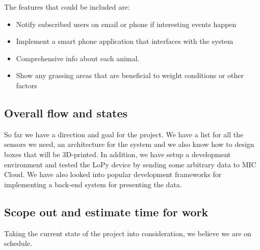	The features that could be included are:
	\begin{itemize}  
		\item Notify subscribed users on email or phone if interesting events happen
		\item Implement a smart phone application that interfaces with the system
		\item Comprehensive info about each animal.
		\item Show any grassing areas that are beneficial to weight conditions or other factors
	\end{itemize}

\subsection{Overall flow and states}
	So far we have a direction and goal for the project. We have a list for all the sensors we need, an architecture for the system and we also know how to design boxes that will be 3D-printed. In addition, we have setup a development environment and tested the LoPy device by sending some arbitrary data to MIC Cloud. We have also looked into popular development frameworks for implementing a back-end system for presenting the data.

\subsection{Scope out and estimate time for work}
	Taking the current state of the project into consideration, we believe we are on schedule. 














